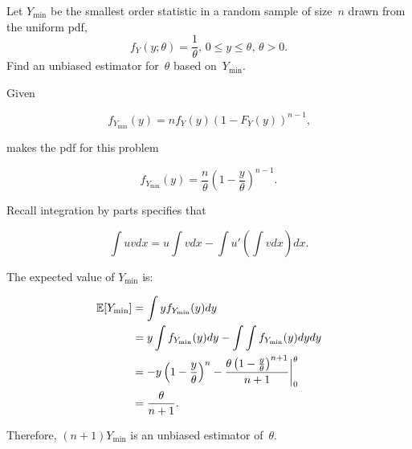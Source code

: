 \begin{problem}
   Let $Y_{\min}$ be the smallest order statistic in a random sample of size~$n$ drawn from the uniform pdf,
  \begin{equation*}
    f_Y(y;\theta) = \frac{1}{\theta}\text{, } 0 \leq y \leq \theta \text{, } \theta > 0\text{.}
  \end{equation*}
  Find an unbiased estimator for~$\theta$ based on~$Y_{\min}$.
\end{problem}

Given

\begin{equation}
  f_{Y_{\min}}(y) = n f_{Y}(y) (1 - F_{Y}(y))^{n-1}\text{,}
\end{equation}

\noindent
makes the pdf for this problem

\begin{equation}
  f_{Y_{\min}}(y) = \frac{n}{\theta} \left(1 - \frac{y}{\theta} \right)^{n-1}\text{.}
\end{equation}

Recall integration by parts specifies that

\begin{equation}
  \int uv dx = u\int v dx - \int u' \left( \int v dx \right) dx \text{.}
\end{equation}

\noindent
The expected value of $Y_{\min}$ is:

\begin{align*}
  \mathbb{E}\lbrack Y_{\min}\rbrack &= \int y f_{Y_{\min}}(y) dy \\
                    &= y\int f_{Y_{\min}}(y) dy - \int \int f_{Y_{\min}}(y) dy dy \\
                    &= -y\left(1 - \frac{y}{\theta}\right)^{n}- \frac{\theta \left(1 - \frac{y}{\theta}\right)^{n+1}}{n+1} \bigg\vert_{0}^{\theta} \\
                    &= \frac{\theta}{n+1}\text{.}
 \end{align*}

 Therefore, $\boxed{(n+1)Y_{\min}}$ is an unbiased estimator of~$\theta$.
